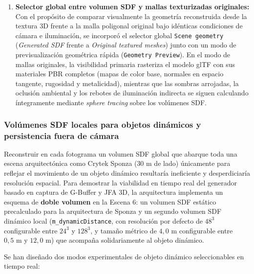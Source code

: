 \begin{enumerate}
  \item \textbf{Selector global entre volumen SDF y mallas texturizadas originales:} Con el propósito de comparar visualmente la geometría reconstruida desde la textura 3D frente a la malla poligonal original bajo idénticas condiciones de cámara e iluminación, se incorporó el selector global \texttt{Scene geometry} (\textit{Generated SDF} frente a \textit{Original textured meshes}) junto con un modo de previsualización geométrica rápida (\texttt{Geometry Preview}). En el modo de mallas originales, la visibilidad primaria rasteriza el modelo glTF con sus materiales PBR completos (mapas de color base, normales en espacio tangente, rugosidad y metalicidad), mientras que las sombras arrojadas, la oclusión ambiental y los rebotes de iluminación indirecta se siguen calculando íntegramente mediante \textit{sphere tracing} sobre los volúmenes SDF.
\end{enumerate}

\subsubsection{Volúmenes SDF locales para objetos dinámicos y persistencia fuera de cámara}

Reconstruir en cada fotograma un volumen SDF global que abarque toda una escena arquitectónica como Crytek Sponza ($30\text{ m}$ de lado) únicamente para reflejar el movimiento de un objeto dinámico resultaría ineficiente y desperdiciaría resolución espacial. Para demostrar la viabilidad en tiempo real del generador basado en captura de G-Buffer y JFA 3D, la arquitectura implementa un esquema de \textbf{doble volumen} en la Escena 6: un volumen SDF estático precalculado para la arquitectura de Sponza y un segundo volumen SDF dinámico local (\texttt{m\_dynamicDistance}, con resolución por defecto de $48^3$ configurable entre $24^3$ y $128^3$, y tamaño métrico de $4,0\text{ m}$ configurable entre $0,5\text{ m}$ y $12,0\text{ m}$) que acompaña solidariamente al objeto dinámico.

Se han diseñado dos modos experimentales de objeto dinámico seleccionables en tiempo real:

